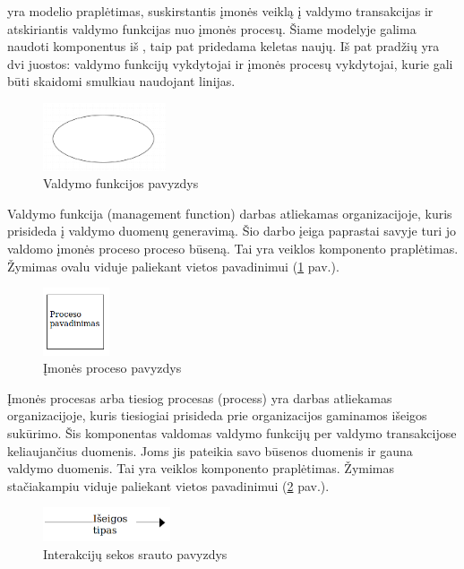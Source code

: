 \DVCM yra \BPMN modelio praplėtimas, suskirstantis įmonės veiklą į valdymo transakcijas ir atskiriantis valdymo funkcijas nuo įmonės procesų. Šiame modelyje galima naudoti komponentus iš \BPMN, taip pat pridedama keletas naujų. Iš pat pradžių yra dvi juostos: valdymo funkcijų vykdytojai ir įmonės procesų vykdytojai, kurie gali būti skaidomi smulkiau naudojant linijas.

\begin{figure}[H]
	\centering
	\includegraphics[height=2cm]{img/dvcm_components/management_function}
	\caption{Valdymo funkcijos pavyzdys}
	\label{img:dvcm_components_management_function}
\end{figure} 

Valdymo funkcija (management function) darbas atliekamas organizacijoje, kuris prisideda į valdymo duomenų generavimą. Šio darbo įeiga paprastai savyje turi jo valdomo įmonės proceso proceso būseną. Tai yra \BPMN veiklos komponento praplėtimas. Žymimas ovalu viduje paliekant vietos pavadinimui (\ref{img:dvcm_components_management_function} pav.).

\begin{figure}[H]
	\centering
	\includegraphics[height=2cm]{img/dvcm_components/process}
	\caption{Įmonės proceso pavyzdys}
	\label{img:dvcm_components_process}
\end{figure}

Įmonės procesas arba tiesiog procesas (process) yra darbas atliekamas organizacijoje, kuris tiesiogiai prisideda prie organizacijos gaminamos išeigos sukūrimo. Šis komponentas valdomas valdymo funkcijų per valdymo transakcijose keliaujančius duomenis. Joms jis pateikia savo būsenos duomenis ir gauna valdymo duomenis. Tai yra \BPMN veiklos komponento praplėtimas. Žymimas stačiakampiu viduje paliekant vietos pavadinimui (\ref{img:dvcm_components_process} pav.).

\begin{figure}[H]
	\centering
	\includegraphics[height=1cm]{img/dvcm_components/sequence_flow}
	\caption{Interakcijų sekos srauto pavyzdys}
	\label{img:dvcm_components_sequence_flow}
\end{figure}

